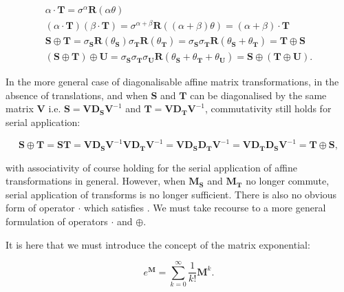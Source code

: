         \begin{gather}
            \alpha \cdot \mathbf{T} = \sigma^{\alpha}\mathbf{R}(\alpha\theta) \\
            (\alpha \cdot \mathbf{T})(\beta \cdot \mathbf{T}) = \sigma^{\alpha + \beta}\mathbf{R}((\alpha + \beta)\theta) = (\alpha + \beta) \cdot \mathbf{T} \\
			\mathbf{S} \oplus \mathbf{T} = \sigma_\mathbf{S}\mathbf{R}(\theta_\mathbf{S})\sigma_\mathbf{T}\mathbf{R}(\theta_\mathbf{T}) = \sigma_\mathbf{S}\sigma_\mathbf{T}\mathbf{R}(\theta_\mathbf{S} + \theta_\mathbf{T}) = \mathbf{T} \oplus \mathbf{S} \\
			(\mathbf{S} \oplus \mathbf{T}) \oplus \mathbf{U} = \sigma_\mathbf{S}\sigma_\mathbf{T}\sigma_\mathbf{U}\mathbf{R}(\theta_\mathbf{S} + \theta_\mathbf{T} + \theta_\mathbf{U}) = \mathbf{S} \oplus (\mathbf{T} \oplus \mathbf{U}).
        \end{gather}
		
		In the more general case of diagonalisable affine matrix transformations, in the absence of translations, and when $\mathbf{S}$ and $\mathbf{T}$ can be diagonalised by the same matrix $\mathbf{V}$ i.e. $\mathbf{S} = \mathbf{VD_SV}^{-1}$ and $\mathbf{T} = \mathbf{VD_TV}^{-1}$, commutativity still holds for serial application:
        
        \begin{equation}
			\mathbf{S} \oplus \mathbf{T} = \mathbf{ST} = \mathbf{VD_SV}^{-1}\mathbf{VD_TV}^{-1} = \mathbf{VD_SD_TV}^{-1} =\mathbf{VD_TD_SV}^{-1} = \mathbf{T} \oplus \mathbf{S},
        \end{equation}
        
        with associativity of course holding for the serial application of affine transformations in general. However, when $\mathbf{M_S}$ and $\mathbf{M_T}$ no longer commute, serial application of transforms is no longer sufficient. There is also no obvious form of operator $\cdot$ which satisfies . We must take recourse to a more general formulation of operators $\cdot$ and $\oplus$.
        
        It is here that we must introduce the concept of the matrix exponential:
        
        \begin{equation}
          e^{\mathbf{M}} = \sum_{k=0}^{\infty}\frac{1}{k!}\mathbf{M}^k. \label{eqn:matrix_exponential}
        \end{equation}
        
